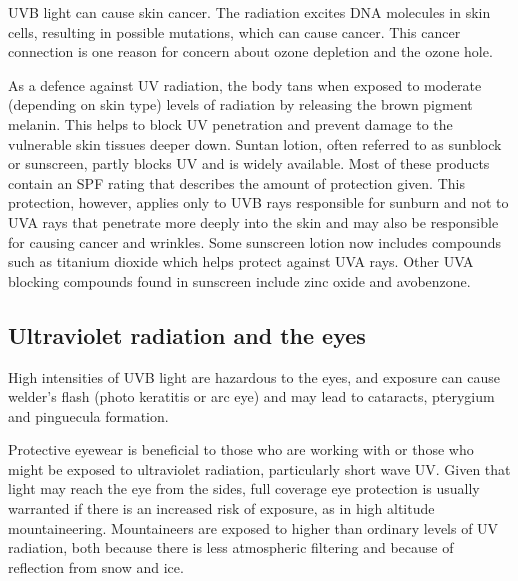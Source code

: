 UVB light can cause skin cancer. The radiation excites DNA molecules in skin cells, resulting in possible mutations, which can cause cancer. This cancer connection is one reason for concern about ozone depletion and the ozone hole.

As a defence against UV radiation, the body tans when exposed to moderate (depending on skin type) levels of radiation by releasing the brown pigment melanin. This helps to block UV penetration and prevent damage to the vulnerable skin tissues deeper down. Suntan lotion, often referred to as sunblock or sunscreen, partly blocks UV and is widely available. Most of these products contain an SPF rating that describes the amount of protection given. This protection, however, applies only to UVB rays responsible for sunburn and not to UVA rays that penetrate more deeply into the skin and may also be responsible for causing cancer and wrinkles. Some sunscreen lotion now includes compounds such as titanium dioxide which helps protect against UVA rays. Other UVA blocking compounds found in sunscreen include zinc oxide and avobenzone.


\subsection{Ultraviolet radiation and the eyes}
High intensities of UVB light are hazardous to the eyes, and exposure can cause welder's flash (photo keratitis or arc eye) and may lead to cataracts, pterygium and pinguecula formation.

Protective eyewear is beneficial to those who are working with or those who might be exposed to ultraviolet radiation, particularly short wave UV. Given that light may reach the eye from the sides, full coverage eye protection is usually warranted if there is an increased risk of exposure, as in high altitude mountaineering. Mountaineers are exposed to higher than ordinary levels of UV radiation, both because there is less atmospheric filtering and because of reflection from snow and ice.

